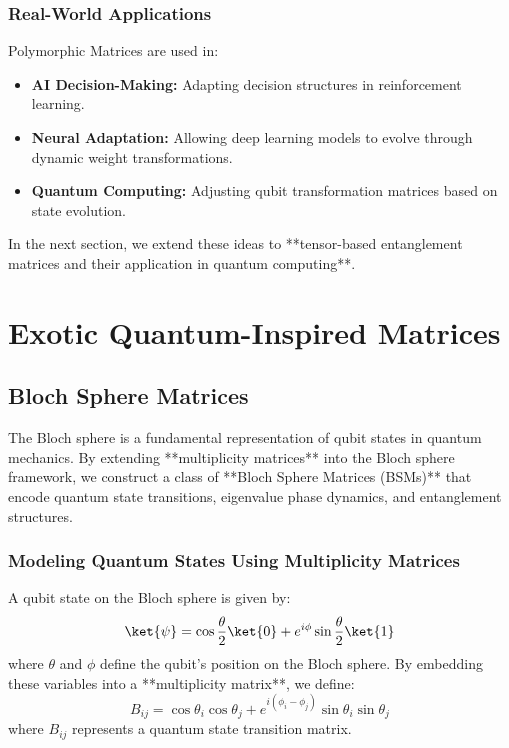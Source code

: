 \documentclass{article}
\theoremstyle{plain}
\begin{document}
\subsubsection{Real-World Applications}
Polymorphic Matrices are used in:
\begin{itemize}
    \item \textbf{AI Decision-Making:} Adapting decision structures in reinforcement learning.
    \item \textbf{Neural Adaptation:} Allowing deep learning models to evolve through dynamic weight transformations.
    \item \textbf{Quantum Computing:} Adjusting qubit transformation matrices based on state evolution.
\end{itemize}

In the next section, we extend these ideas to **tensor-based entanglement matrices and their application in quantum computing**.
\section{Exotic Quantum-Inspired Matrices}

\subsection{Bloch Sphere Matrices}

The Bloch sphere is a fundamental representation of qubit states in quantum mechanics. By extending **multiplicity matrices** into the Bloch sphere framework, we construct a class of **Bloch Sphere Matrices (BSMs)** that encode quantum state transitions, eigenvalue phase dynamics, and entanglement structures.

\subsubsection{Modeling Quantum States Using Multiplicity Matrices}
A qubit state on the Bloch sphere is given by:
\begin{equation}
    \ket{\psi} = \cos\frac{\theta}{2} \ket{0} + e^{i\phi} \sin\frac{\theta}{2} \ket{1}
\end{equation}
where \( \theta \) and \( \phi \) define the qubit’s position on the Bloch sphere. By embedding these variables into a **multiplicity matrix**, we define:
\begin{equation}
    B_{ij} = \cos\theta_i \cos\theta_j + e^{i (\phi_i - \phi_j)} \sin\theta_i \sin\theta_j
\end{equation}
where \( B_{ij} \) represents a quantum state transition matrix.
\end{document}
